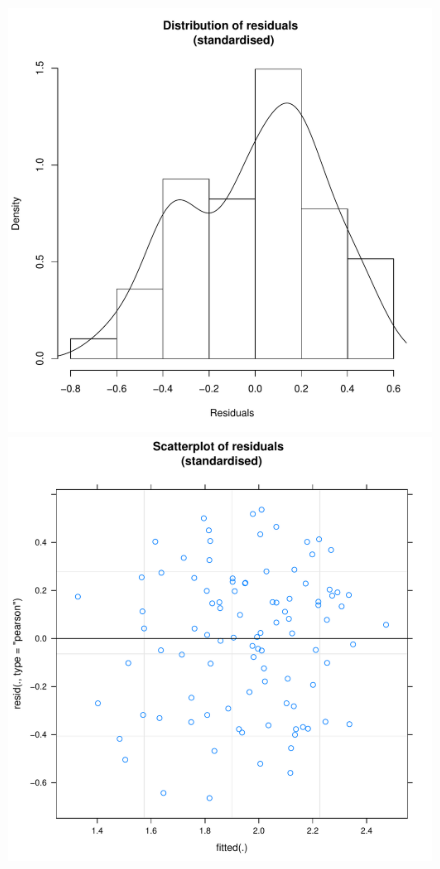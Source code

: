 \begin{CJK}{UTF8}{gbsn}
            \begin{figure}[htbp]
              \includegraphics[scale =.4]{images/MLM3aLogHist.pdf}
              \includegraphics[scale =.4]{images/MLM3aLogScatter.pdf}

\end{figure}
\end{CJK}
